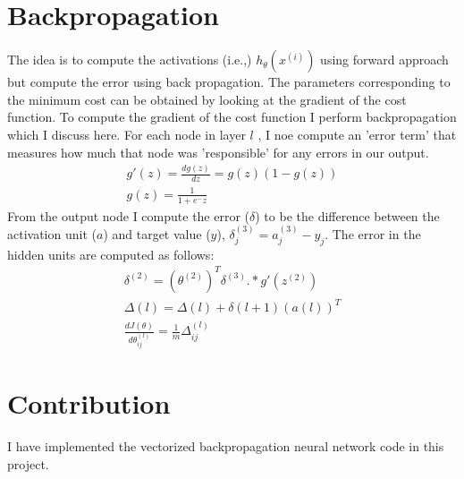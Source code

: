 \documentclass[twocolumn]{article}
\begin{document}
\section{Backpropagation}
The idea is to compute the activations (i.e.,) $h_{\theta}(x^{(i)})$ using forward approach but compute the error using back propagation.
The parameters corresponding to the minimum cost can be obtained by looking at the gradient of the cost function. To compute the gradient of the cost function I perform backpropagation which I discuss here.
For each node in layer $l$ , I noe compute an 'error term'  that measures how much that node was 'responsible' for any errors in our output.
\begin{align*}
	g'(z) = \frac{dg(z)}{dz} = g(z)(1-g(z))\\
	g(z) =  \frac{1}{1+e^-z}
\end{align*}
From the output node I compute the error ($\delta$) to be the difference between the activation unit ($a$) and target value ($y$), $\delta_j^{(3)} = a_j^{(3)} - y_j$. The error in the hidden units are computed as follows:
\begin{align*}
	\delta^{(2)} = (\theta^{(2)})^T\delta^{(3)}.*g'(z^{(2)})\\
	\Delta{(l)} = \Delta{(l)} + \delta{(l+1)}(a{(l)})^T\\
	\frac{dJ(\theta)}{d\theta_{ij}^{(l)}} = \frac{1}{m}\Delta_{ij}^{(l)}
\end{align*}
\section{Contribution}
I have implemented the vectorized backpropagation neural network code in this project.
\end{document}
